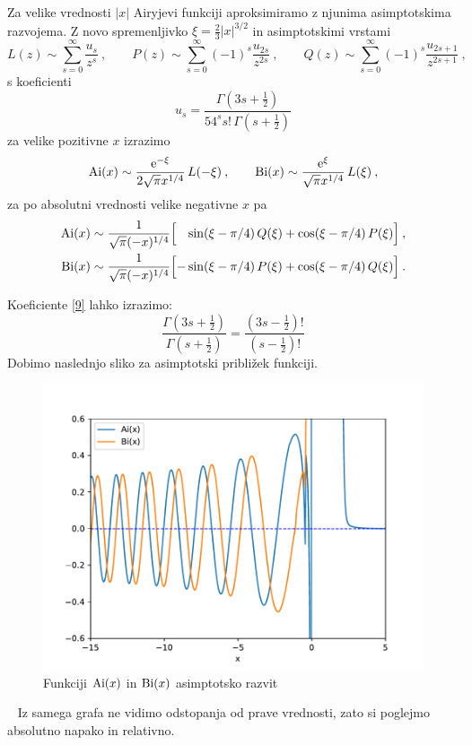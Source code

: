 Za velike vrednosti $|x|$ Airyjevi funkciji aproksimiramo
z njunima asimp\-tot\-ski\-ma razvojema.  Z novo spremenljivko
$\xi=\frac{2}{3} |x|^{3/2}$ in asimptotskimi vrstami
%
\begin{equation}
  L(z) \sim \sum_{s=0}^\infty \frac{u_s}{z^s}\>,\qquad
  P(z) \sim \sum_{s=0}^\infty (-1)^s \frac{u_{2s}}{z^{2 s}}\>,\qquad
  Q(z) \sim \sum_{s=0}^\infty (-1)^s \frac{u_{2s+1}}{z^{2 s+1}}\>,
\end{equation}
s koeficienti
\begin{equation}
u_s = \frac{ \Gamma(3s + \frac{1}{2})}
        {54^s s!\, \Gamma(s + \frac{1}{2}) } \label{9}
\end{equation}
za velike pozitivne $x$ izrazimo
%
\begin{equation}
\mathrm{Ai}(x)\sim  \frac{\mathrm{e}^{-\xi}}{2\sqrt{\pi} x^{1/4}} \, L(-\xi) \>, \qquad
\mathrm{Bi}(x)\sim  \frac{\mathrm{e}^{\xi}} { \sqrt{\pi} x^{1/4}} \, L(\xi)\>,
\end{equation}
%
za po absolutni vrednosti velike negativne $x$ pa
%
%
\begin{align}
    \mathrm{Ai}(x)&\sim  \frac{1}{\sqrt{\pi} (-x)^{1/4}}
    \Bigl[ \phantom{-}\sin(\xi-\pi/4) \, Q(\xi)
                    + \cos(\xi-\pi/4) \, P(\xi)\Bigr] \>, \\
    \mathrm{Bi}(x)&\sim  \frac{1}{\sqrt{\pi} (-x)^{1/4}}
    \Bigl[ - \sin(\xi-\pi/4) \, P(\xi)
      + \cos(\xi-\pi/4) \, Q(\xi)\Bigr]\>.
\end{align}

Koeficiente \eqref{9} lahko izrazimo:
\begin{equation}
    \frac{\Gamma(3s+\frac{1}{2})}{\Gamma(s+\frac{1}{2})} = \frac{(3s-\frac{1}{2})!}{(s-\frac{1}{2})!}
\end{equation}
Dobimo naslednjo sliko za asimptotski približek funkciji.
\newpage
\begin{figure}[h]
    \begin{center}
        \includegraphics[width=13cm]{sections/poglavje1/pdfs/big_airy.pdf}
        \caption{Funkciji $\mathrm{Ai}(x)$ in $\mathrm{Bi}(x)$ asimptotsko razvit}
        \label{slika 3}
    \end{center}
\end{figure}\
\newpage
Iz samega grafa ne vidimo odstopanja od prave vrednosti, zato si poglejmo absolutno napako in relativno.

